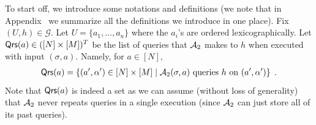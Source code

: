 %



To start off, we introduce some notations and definitions (we note that in Appendix~ we summarize all the definitions we introduce in one place).
Fix $(U,h)\in \mathcal{G}$. Let $U=\{a_1,\ldots,a_u\}$ where the $a_i$'s are ordered  lexicographically. 
Let $\mathsf{Qrs}(a)\in ([N]\times [M])^T$ be the list of queries that $\mathcal{A}_2$ makes to $h$ when executed with input $({\sigma},a)$. Namely, for $a\in [N]$,
\begin{align*}
\mathsf{Qrs}(a) = \left\{ (a',\alpha') \in [N]\times [M] \mid \mathcal{A}_2(\sigma,a) \text{  queries $h$ on   $(a',\alpha')$}\right\}\;.
\end{align*}
Note that $\mathsf{Qrs}(a)$ is indeed a set as we can assume (without loss of generality) that $\mathcal{A}_2$ never repeats queries in a single execution (since $\mathcal{A}_2$ can just store all of its past queries).

